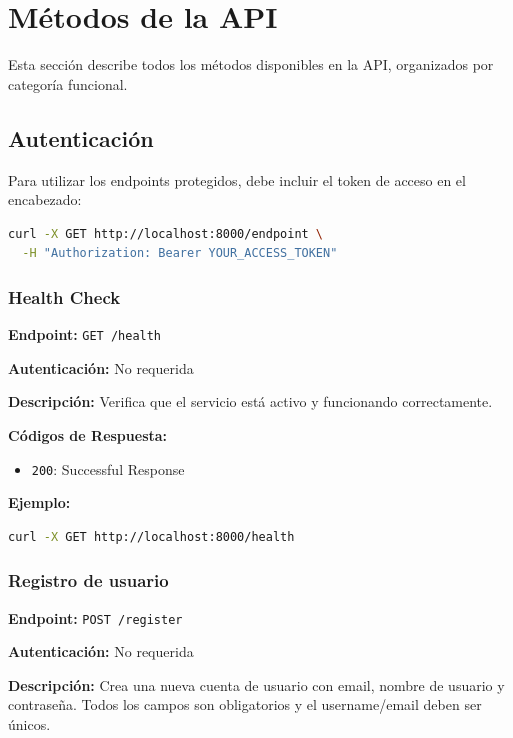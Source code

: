 \section[Métodos de la API]{Métodos de la API}
\label{Métodos de la API}

Esta sección describe todos los métodos disponibles en la API, organizados por categoría funcional.

\subsection{Autenticación}
\label{subsection:A-3-Autenticación}

Para utilizar los endpoints protegidos, debe incluir el token de acceso en el encabezado:

\begin{lstlisting}[language=bash]
curl -X GET http://localhost:8000/endpoint \
  -H "Authorization: Bearer YOUR_ACCESS_TOKEN"
\end{lstlisting}

\subsubsection{Health Check}
\label{Health Check}

\textbf{Endpoint:} \texttt{GET /health}

\textbf{Autenticación:} No requerida

\textbf{Descripción:} Verifica que el servicio está activo y funcionando correctamente.

\textbf{Códigos de Respuesta:}
\begin{itemize}
    \item \texttt{200}: Successful Response
\end{itemize}

\textbf{Ejemplo:}

\begin{lstlisting}[language=bash]
curl -X GET http://localhost:8000/health
\end{lstlisting}

\subsubsection{Registro de usuario}
\label{subsubsection:A-3-Registro de usuario}

\textbf{Endpoint:} \texttt{POST /register}

\textbf{Autenticación:} No requerida

\textbf{Descripción:} Crea una nueva cuenta de usuario con email, nombre de usuario y contraseña. Todos los campos son obligatorios y el username/email deben ser únicos.

